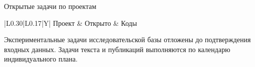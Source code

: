 \begin{frame}{Открытые задачи по проектам}
\begin{tabularx}{\linewidth}{|L{0.30\linewidth}|L{0.17\linewidth}|Y|}
\hline Проект & Открыто & Коды \\\hline
\ProgOpenRows
\end{tabularx}
\SlideGap
Экспериментальные задачи исследовательской базы отложены до подтверждения входных данных. Задачи текста и публикаций выполняются по календарю индивидуального плана.
\end{frame}
